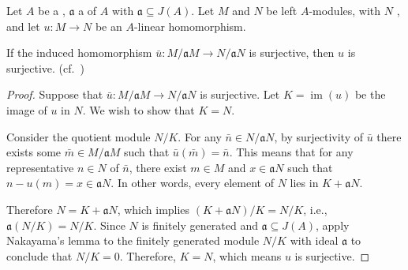 \begin{proposition}  \label{proposition:nakayamas_surjection_criterion_for_homomorphisms_to_finitely_generated_modules_over_a_ring}

	Let $A$ be a , $\mathfrak{a}$ a  of $A$ with $\mathfrak{a} \subseteq J(A)$. Let $M$ and $N$ be left $A$-modules, with $N$ , and let $u \colon M \to N$ be an $A$-linear homomorphism.

	If the induced homomorphism $\bar{u} \colon M/\mathfrak{a}M \to N/\mathfrak{a}N$ is surjective, then $u$ is surjective. (cf.\ \cite[Chapter 2, Exercise 10]{atiyah_macdonald})
\end{proposition}
\begin{proof}
	Suppose that $\bar{u} \colon M/\mathfrak{a}M \to N/\mathfrak{a}N$ is surjective. Let $K = \operatorname{im}(u)$ be the image of $u$ in $N$. We wish to show that $K = N$.

	Consider the quotient module $N/K$. For any $\bar{n} \in N/\mathfrak{a}N$, by surjectivity of $\bar{u}$ there exists some $\bar{m} \in M/\mathfrak{a}M$ such that $\bar{u}(\bar{m}) = \bar{n}$. This means that for any representative $n \in N$ of $\bar{n}$, there exist $m \in M$ and $x \in \mathfrak{a}N$ such that $n - u(m) = x \in \mathfrak{a}N$. In other words, every element of $N$ lies in $K + \mathfrak{a}N$.

	Therefore $N = K + \mathfrak{a}N$, which implies $(K + \mathfrak{a}N)/K = N/K$, i.e., $\mathfrak{a}(N/K) = N/K$. Since $N$ is finitely generated and $\mathfrak{a} \subseteq J(A)$, apply Nakayama's lemma to the finitely generated module $N/K$ with ideal $\mathfrak{a}$ to conclude that $N/K = 0$. Therefore, $K = N$, which means $u$ is surjective.
\end{proof}
